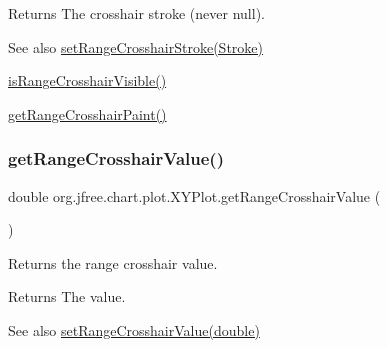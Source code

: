 \begin{DoxyReturn}{Returns}
The crosshair stroke (never {\ttfamily null}).
\end{DoxyReturn}
\begin{DoxySeeAlso}{See also}
\mbox{\hyperlink{classorg_1_1jfree_1_1chart_1_1plot_1_1_x_y_plot_a8e66a4d694e64fad71b706a7ca7e1de2}{set\+Range\+Crosshair\+Stroke(\+Stroke)}} 

\mbox{\hyperlink{classorg_1_1jfree_1_1chart_1_1plot_1_1_x_y_plot_a141d93dd4ffb2ed0a73aa37e745ed9ee}{is\+Range\+Crosshair\+Visible()}} 

\mbox{\hyperlink{classorg_1_1jfree_1_1chart_1_1plot_1_1_x_y_plot_ab531ad9c9bd346bb3c90e9416097e898}{get\+Range\+Crosshair\+Paint()}} 
\end{DoxySeeAlso}
\mbox{\label{classorg_1_1jfree_1_1chart_1_1plot_1_1_x_y_plot_a5ea3dd940ae92c3196aa77833a6c96d1}} 
\subsubsection{\texorpdfstring{get\+Range\+Crosshair\+Value()}{getRangeCrosshairValue()}}
{\footnotesize\ttfamily double org.\+jfree.\+chart.\+plot.\+X\+Y\+Plot.\+get\+Range\+Crosshair\+Value (\begin{DoxyParamCaption}{ }\end{DoxyParamCaption})}

Returns the range crosshair value.

\begin{DoxyReturn}{Returns}
The value.
\end{DoxyReturn}
\begin{DoxySeeAlso}{See also}
\mbox{\hyperlink{classorg_1_1jfree_1_1chart_1_1plot_1_1_x_y_plot_ac6bdd558bdf17eb82e743b060e8170e8}{set\+Range\+Crosshair\+Value(double)}} 
\end{DoxySeeAlso}
\mbox{\label{classorg_1_1jfree_1_1chart_1_1plot_1_1_x_y_plot_afe41d7b34fa30b113f4be008f8121b3d}} 
